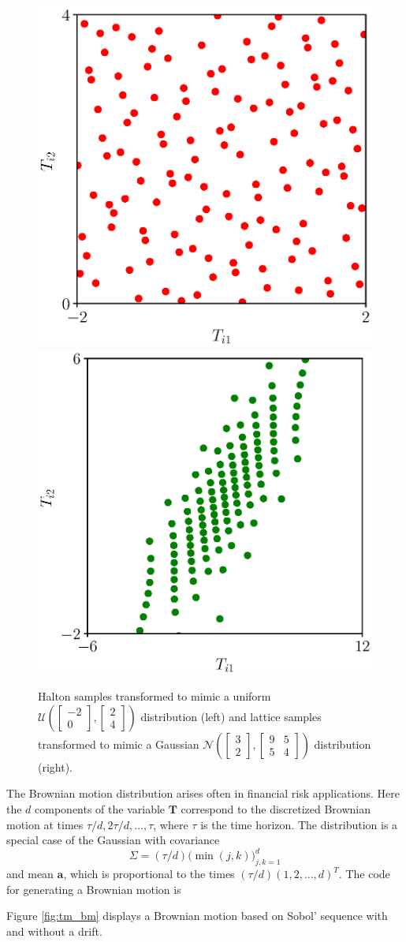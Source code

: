 \documentclass[graybox]{svmult}
\begin{document}
\begin{figure}[t]
	\includegraphics[width=.45\textwidth]{QMCSoftwareArticle/vfigs/tm_uniform.eps} 
	\includegraphics[width=.45\textwidth]{QMCSoftwareArticle/vfigs/tm_gaussian.eps}
	\caption{Halton samples transformed to mimic a uniform $\mathcal{U}\left( \begin{bmatrix} -2 \\ 0 \end{bmatrix},\begin{bmatrix} 2 \\ 4 \end{bmatrix} \right)$ 
	distribution (left) and lattice samples transformed to mimic a Gaussian $\mathcal{N}\left(\begin{bmatrix} 3 \\ 2 \end{bmatrix}, \begin{bmatrix} 9 & 5 \\ 5 & 4 \end{bmatrix} \right)$ distribution (right).}
	\label{fig:tm_ug}
\end{figure}

The Brownian motion distribution arises often in financial risk applications.  Here the $d$ components of the variable $\boldsymbol{T}$ correspond to the discretized Brownian motion at times $\tau/d, 2\tau/d, \ldots, \tau$, where $\tau$ is the time horizon.  The distribution is a special case of the Gaussian with covariance 
\begin{equation} \label{eq:BMcov}
	\Sigma = (\tau/d) \bigl (\min(j,k) \bigr)_{j,k=1}^d
\end{equation}
and mean $\boldsymbol{a}$, which  is proportional to the times $(\tau/d)(1, 2, \ldots, d)^T$. The code for generating a Brownian motion is

Figure \ref{fig:tm_bm} displays a Brownian motion based on Sobol' sequence with and without a drift.
\end{document}
